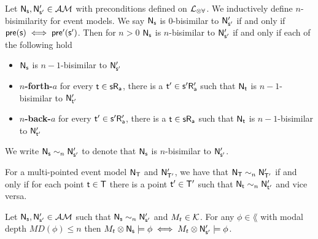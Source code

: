 \begin{defn} \label{nBisimEvent}
	Let $\aMod{\evMo_s, \evMo'_{s'}} \in \eventClass$ with preconditions defined on $\langArbAct$.
	We inductively define $n$-bisimilarity for event models.
	We say $\aMod{\evMo_s}$ is $0$-bisimilar to $\aMod{\evMo'_{s'}}$ if and only if $\aMod{pre(s) \iff
		pre'(s')}$.
	Then for $n > 0$ $\aMod{\evMo_s}$ is $n$-bisimilar to $\aMod{\evMo'_{s'}}$ if and only if each of the following hold
	\begin{itemize}
		\item $\aMod{\evMo_s}$ is $n-1$-bisimilar to $\aMod{\evMo'_{s'}}$
		\item {\bf $n$-forth-$a$} for every $\aMod{t \in s R_a}$, there is a $\aMod{t' \in s' R'_a}$
		such that $\aMod{\evMo_t}$ is
		$n-1$-bisimilar to $\aMod{\evMo'_{t'}}$
		\item {\bf $n$-back-$a$} for every $\aMod{t' \in s' R'_a}$, there is a $\aMod{t \in s R_a}$ such
		that $\aMod{\evMo_t}$ is
		$n-1$-bisimilar to $\aMod{\evMo'_{t'}}$
	\end{itemize}
	We write $\evMo_\evs \sim_n \evMo'_{\evs'}$ to denote that $\evMo_\evs$ is $n$-bisimilar to
	$\evMo'_{\evs'}$.
\end{defn}

For a multi-pointed event model $\aMod{\evMo_T}$ and $\aMod{\evMo'_{T'}}$, we have that $\evMo_\evT \sim_n
\evMo'_{\evT'}$ if and only if for each point $\evt \in \evT$ there is a point $\evt' \in \evT'$
such that $\evMo_\evt \sim_n \evMo'_{\evt'}$ and vice versa.

\begin{lemma} \label{nBisimilarEventExec}
	Let $\evMo_\evs, \evMo'_{\evs'} \in \eventClass$ such that $\evMo_\evs \sim_n \evM'_{\evs'}$ and
	$\krMo_t \in \kripkeClass$.
	For any $\phi \in \lang$ with modal depth $MD(\phi) \leq n$ then $\krMo_t \otimes \evMo_\evs \models \phi
	\iff \krMo_t \otimes \evMo'_{\evs'} \models \phi$.
\end{lemma}

